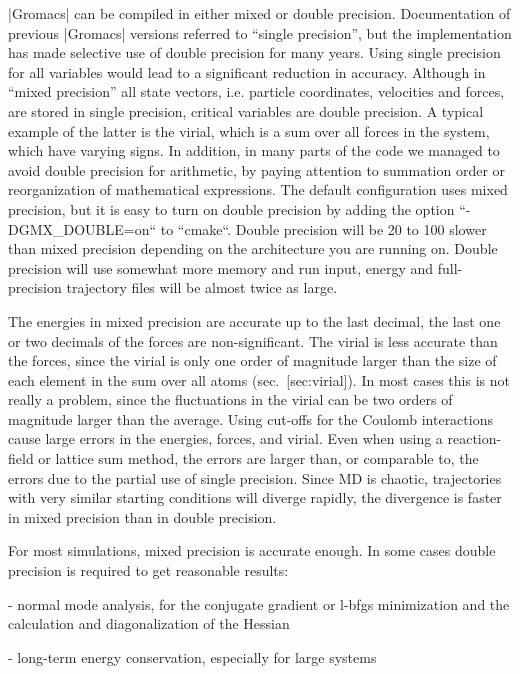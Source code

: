 |Gromacs| can be compiled in either mixed or double precision.
Documentation of previous |Gromacs| versions referred to “single
precision”, but the implementation has made selective use of double
precision for many years. Using single precision for all variables would
lead to a significant reduction in accuracy. Although in “mixed
precision” all state vectors, i.e. particle coordinates, velocities and
forces, are stored in single precision, critical variables are double
precision. A typical example of the latter is the virial, which is a sum
over all forces in the system, which have varying signs. In addition, in
many parts of the code we managed to avoid double precision for
arithmetic, by paying attention to summation order or reorganization of
mathematical expressions. The default configuration uses mixed
precision, but it is easy to turn on double precision by adding the
option ``-DGMX\_DOUBLE=on`` to ``cmake``. Double precision will be 20 to 100%
slower than mixed precision depending on the architecture you are
running on. Double precision will use somewhat more memory and run
input, energy and full-precision trajectory files will be almost twice
as large.

The energies in mixed precision are accurate up to the last decimal, the
last one or two decimals of the forces are non-significant. The virial
is less accurate than the forces, since the virial is only one order of
magnitude larger than the size of each element in the sum over all atoms
(sec. [sec:virial]). In most cases this is not really a problem, since
the fluctuations in the virial can be two orders of magnitude larger
than the average. Using cut-offs for the Coulomb interactions cause
large errors in the energies, forces, and virial. Even when using a
reaction-field or lattice sum method, the errors are larger than, or
comparable to, the errors due to the partial use of single precision.
Since MD is chaotic, trajectories with very similar starting conditions
will diverge rapidly, the divergence is faster in mixed precision than
in double precision.

For most simulations, mixed precision is accurate enough. In some cases
double precision is required to get reasonable results:

-  normal mode analysis, for the conjugate gradient or l-bfgs
   minimization and the calculation and diagonalization of the Hessian

-  long-term energy conservation, especially for large systems

